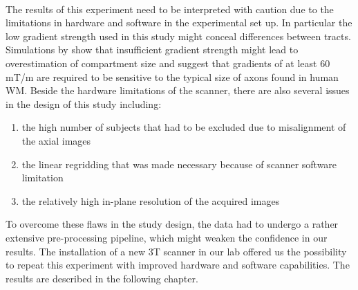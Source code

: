 \paragraph{} The results of this experiment need to be interpreted with caution due to the limitations in hardware and software in the experimental set up. In particular the low gradient strength used in this study might conceal differences between tracts. Simulations by \citet{Latt:2007} show that insufficient gradient strength might lead to overestimation of compartment size and suggest that gradients of at least 60 mT/m are required to be sensitive to the typical size of axons found in human WM. Beside the hardware limitations of the scanner, there are also several issues in the design of this study including:
\begin{enumerate}
	\item the high number of subjects that had to be excluded due to misalignment of the axial images
	\item the linear regridding that was made necessary because of scanner software limitation
	\item the relatively high in-plane resolution of the acquired images
\end{enumerate}
To overcome these flaws in the study design, the data had to undergo a rather extensive pre-processing pipeline, which might weaken the confidence in our results. The installation of a new 3T scanner in our lab offered us the possibility to repeat this experiment with improved hardware and software capabilities. The results are described in the following chapter.

